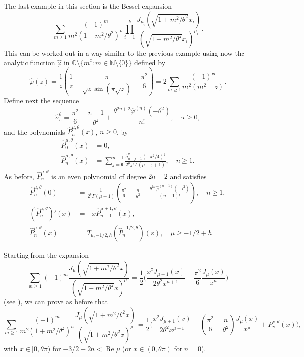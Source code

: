 \documentclass[12pt,leqno]{amsart}
\numberwithin{equation}{section}
\theoremstyle{plain}
\newcommand{\NN}{\mathbb{N}}
\newcommand{\CC}{\mathbb{C}}
\renewcommand{\Re}{\operatorname{Re}}
\begin{document}
\bigskip

The last example in this section is the Bessel expansion
\begin{equation*}
\sum_{m\ge 1} \frac{(-1)^m}{m^2(1+m^2/\theta ^2)^{n}}
\prod_{i=1}^k\frac{J_{\mu_i}(\sqrt{1+m^2/\theta ^2}x_i)}
{(\sqrt{1+m^2/\theta ^2}x_i)^{\mu_i}}.
\end{equation*}
This can be worked out in a way similar to the previous example using now
the analytic function $\hat\varphi$ in $\CC\setminus\{m^2: m\in \NN\setminus\{0\}\}$ defined by
\begin{equation*}
\hat\varphi(z) = \frac{1}{z} \left(\frac{1}{z}-\frac{\pi}{\sqrt z\sin(\pi \sqrt {z})}
+ \frac{\pi^2}{6}\right)
= 2 \sum_{m\ge 1}\frac{(-1)^m}{m^2(m^2-z)}.
\end{equation*}
Define next the sequence
\begin{equation*}
\hat a_{n}^\theta = \frac{\pi^2}{6}-\frac{n+1}{\theta ^2}
+ \frac{\theta ^{2n+2}\hat \varphi^{(n)}(-\theta ^2)}{n!}, \quad n\ge0,
\end{equation*}
and the polynomials $\hat P_n^{\mu,\theta }(x)$, $n\ge 0$, by
\begin{align*}
\hat P_0^{\mu,\theta }(x) &= 0,\\
\hat P_n^{\mu,\theta }(x) &= \sum_{j=0}^{n-1}\frac{\hat a_{n-j-1}^\theta(-x^2/4)^{j}}{2^{\mu}j!\,\Gamma(\mu+j+1)}, \quad n\ge 1.
\end{align*}
As before, $\hat P_n^{\mu,\theta }$ is an even polynomial of degree $2n-2$ and satisfies
\begin{align*}
\hat P_n^{\mu,\theta }(0) &= \frac{1}{2^{\mu} \Gamma(\mu+1)}\left(\frac{\pi^2}{6}
- \frac{n}{\theta ^2}+\frac{\theta ^{2n}\hat \varphi^{(n-1)}(-\theta ^2)}{(n-1)!}\right), \quad n\ge 1,\\
(\hat P_n^{\mu,\theta })'(x) &= -x\hat P_{n-1}^{\mu+1,\theta }(x),\\
\hat P_n^{\mu,\theta }(x) &= T_{\mu,-1/2,h}(\hat P_n^{-1/2,\theta })(x),\quad \mu\ge -1/2+h.
\end{align*}

Starting from the expansion
\begin{equation*}
\sum_{m\ge 1} (-1)^m\frac{J_{\mu}(\sqrt{1+m^2/\theta ^2}x)}
{(\sqrt{1+m^2/\theta ^2}x)^{\mu}}
= \frac{1}{2} \bigg(\frac{x^2J_{\mu+1}(x)}{2\theta^2 x^{\mu+1}}
-\frac{\pi^2}{6}\frac{J_\mu(x)}{x^\mu}\bigg)
\end{equation*}
(see \cite[5.7.22.4, p.~682]{PBM1}), we can prove as before that
\begin{equation*}
\sum_{m\ge 1} \frac{(-1)^m}{m^2(1+m^2/\theta ^2)^{n}}
\frac{J_{\mu}(\sqrt{1+m^2/\theta ^2}x)}
{(\sqrt{1+m^2/\theta ^2}x)^{\mu}}
= \frac{1}{2} \bigg( \frac{x^2J_{\mu+1}(x)}{2\theta^2 x^{\mu+1}}
- \left(\frac{\pi^2}{6}-\frac{n}{\theta ^2}\right)
\frac{J_\mu(x)}{ x^\mu}+P_{n}^{\mu,\theta}(x)\bigg),
\end{equation*}
with $x\in[0,\theta\pi )$ for $-3/2-2n< \Re \mu$ (or $x \in (0,\theta \pi)$ for $n=0$).
\end{document}
